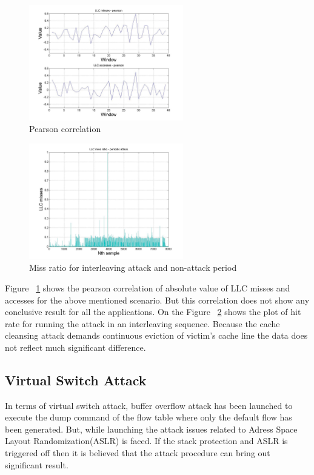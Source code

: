 \documentclass[a4paper,10pt]{article}
\begin{document}
\begin{figure}[htb]
\centering
\includegraphics[width=0.6\textwidth]{Figures/fig7.jpg}
\caption{Pearson correlation}
\label{fig:pc}
\end{figure}

\begin{figure}[htb]
\centering
\includegraphics[width=0.6\textwidth]{Figures/fig3.jpg}
\caption{Miss ratio for interleaving attack and non-attack period}
\label{fig:il}
\end{figure}

Figure ~\ref{fig:pc} shows the pearson correlation of absolute value of LLC misses and accesses for the above mentioned scenario. But this correlation does not show any conclusive result for all the applications. On the Figure ~\ref{fig:il} shows the plot of hit rate for running the attack in an interleaving sequence. Because the cache cleansing attack demands continuous eviction of victim's cache line the data does not reflect much significant difference.  


\subsection{Virtual Switch Attack}
In terms of virtual switch attack, buffer overflow attack has been launched to execute the dump command of the flow table where only the default flow has been generated. But, while launching the attack issues related to Adress Space Layout Randomization(ASLR) is faced. If the stack protection and ASLR is triggered off then it is believed that the attack procedure can bring out significant result. 
\medskip
\end{document}
